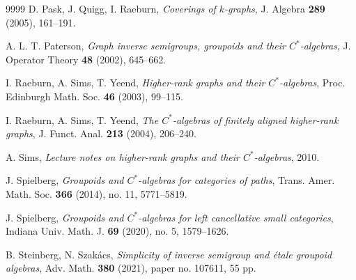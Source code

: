\documentclass[a4paper,reqno,11pt]{amsart}
\numberwithin{equation}{section}
\theoremstyle{definition}
\theoremstyle{remark}
\begin{document}
\begin{thebibliography}{9999}
D. Pask, J. Quigg, I. Raeburn, \emph{Coverings of $k$-graphs}, J. Algebra \textbf{289} (2005), 161--191.

A. L. T. Paterson, \emph{Graph inverse semigroups, groupoids and their $C^*$-algebras}, J. Operator Theory \textbf{48} (2002), 645--662.

I. Raeburn, A. Sims, T. Yeend, \emph{Higher-rank graphs and their $C^*$-algebras}, Proc. Edinburgh Math. Soc. \textbf{46} (2003), 99--115.

I. Raeburn, A. Sims, T. Yeend, \emph{The $C^*$-algebras of finitely aligned higher-rank graphs}, J. Funct. Anal. \textbf{213} (2004), 206--240.

A. Sims, \emph{Lecture notes on higher-rank graphs and their $C^*$-algebras}, 2010.

J. Spielberg, \emph{Groupoids and $C^*$-algebras for categories of paths}, Trans. Amer. Math. Soc. \textbf{366} (2014), no. 11, 5771--5819.

J. Spielberg, \emph{Groupoids and $C^*$-algebras for left cancellative small categories}, Indiana Univ. Math. J. \textbf{69} (2020), no. 5, 1579--1626.

B. Steinberg, N. Szak\'{a}cs, \emph{Simplicity of inverse semigroup and \'{e}tale groupoid algebras}, Adv. Math. \textbf{380} (2021), paper no. 107611, 55 pp.

\end{thebibliography}
\end{document}
